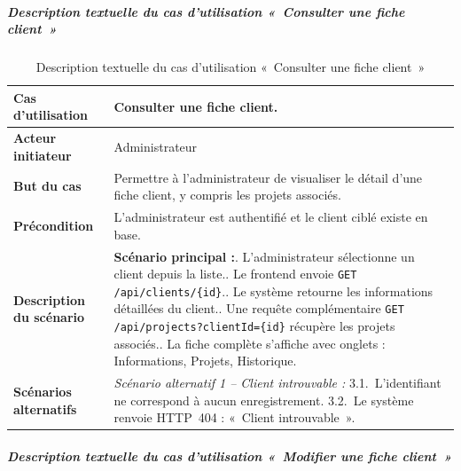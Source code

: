 \subparagraph{Description textuelle du cas d'utilisation «~Consulter une fiche client~»}

\begin{table}[H]
  \caption{Description textuelle du cas d'utilisation «~Consulter une fiche client~»}
  \label{tab:cu-consulter-client}
  \centering
  \begin{tabularx}{\textwidth}{|L{3.8cm}|X|}
    \hline
    \textbf{Cas d'utilisation} & Consulter une fiche client. \\
    \hline
    \textbf{Acteur initiateur} & Administrateur \\
    \hline
    \textbf{But du cas} & Permettre à l'administrateur de visualiser le détail d'une fiche client, y compris les projets associés. \\
    \hline
    \textbf{Précondition} & L'administrateur est authentifié et le client ciblé existe en base. \\
    \hline
    \textbf{Description du scénario} &
    \textbf{Scénario principal :}. L'administrateur sélectionne un client depuis la liste.. Le frontend envoie \texttt{GET /api/clients/\{id\}}.. Le système retourne les informations détaillées du client.. Une requête complémentaire \texttt{GET /api/projects?clientId=\{id\}} récupère les projets associés.. La fiche complète s'affiche avec onglets : Informations, Projets, Historique.\\
    \hline
    \textbf{Scénarios alternatifs} &
    \textit{Scénario alternatif 1 -- Client introuvable :}\newline
    \hspace*{6pt}3.1.~L'identifiant ne correspond à aucun enregistrement.\newline
    \hspace*{6pt}3.2.~Le système renvoie HTTP~404 : «~Client introuvable~».\\
    \hline
  \end{tabularx}
\end{table}

\subparagraph{Description textuelle du cas d'utilisation «~Modifier une fiche client~»}

